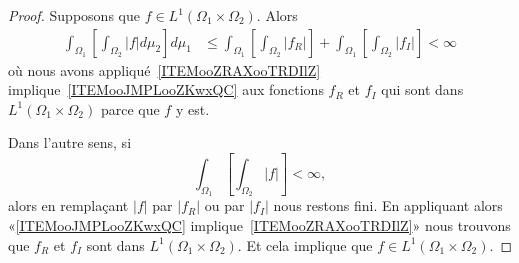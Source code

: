 \begin{proof}
	Supposons que \( f\in L^1(\Omega_1\times \Omega_2)\). Alors
	\begin{subequations}
		\begin{align}
			\int_{\Omega_1}\left[ \int_{\Omega_2}| f |d\mu_2 \right]d\mu_1 & \leq \int_{\Omega_1}\left[ \int_{\Omega_2}| f_R | \right]+\int_{\Omega_1}\left[ \int_{\Omega_2}| f_I | \right]<\infty
		\end{align}
	\end{subequations}
	où nous avons appliqué~\ref{ITEMooZRAXooTRDIlZ} implique~\ref{ITEMooJMPLooZKwxQC} aux fonctions \( f_R\) et \( f_I\) qui sont dans \( L^1(\Omega_1\times \Omega_2)\) parce que \( f\) y est.

	Dans l'autre sens, si
	\begin{equation}
		\int_{\Omega_1}\left[ \int_{\Omega_2}| f | \right]<\infty,
	\end{equation}
	alors en remplaçant \( | f |\) par \( | f_R |\) ou par \( | f_I |\) nous restons fini. En appliquant alors «\ref{ITEMooJMPLooZKwxQC} implique~\ref{ITEMooZRAXooTRDIlZ}» nous trouvons que \( f_R\) et \( f_I\) sont dans \( L^1(\Omega_1\times \Omega_2)\). Et cela implique que \( f\in L^1(\Omega_1\times \Omega_2)\).
\end{proof}

